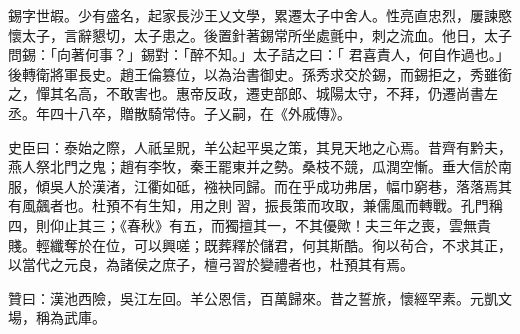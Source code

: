 \begin{pinyinscope}
 錫字世嘏。少有盛名，起家長沙王乂文學，累遷太子中舍人。性亮直忠烈，屢諫愍懷太子，言辭懇切，太子患之。後置針著錫常所坐處氈中，刺之流血。他日，太子問錫：「向著何事？」錫對：「醉不知。」太子詰之曰：「
 君喜責人，何自作過也。」後轉衛將軍長史。趙王倫篡位，以為治書御史。孫秀求交於錫，而錫拒之，秀雖銜之，憚其名高，不敢害也。惠帝反政，遷吏部郎、城陽太守，不拜，仍遷尚書左丞。年四十八卒，贈散騎常侍。子乂嗣，在《外戚傳》。



 史臣曰：泰始之際，人祇呈貺，羊公起平吳之策，其見天地之心焉。昔齊有黔夫，燕人祭北門之鬼；趙有李牧，秦王罷東并之勢。桑枝不競，瓜潤空慚。垂大信於南服，傾吳人於漢渚，江衢如砥，襁袂同歸。而在乎成功弗居，幅巾窮巷，落落焉其有風飆者也。杜預不有生知，用之則
 習，振長策而攻取，兼儒風而轉戰。孔門稱四，則仰止其三；《春秋》有五，而獨擅其一，不其優歟！夫三年之喪，雲無貴賤。輕纖奪於在位，可以興嗟；既葬釋於儲君，何其斯酷。徇以茍合，不求其正，以當代之元良，為諸侯之庶子，檀弓習於變禮者也，杜預其有焉。



 贊曰：漢池西險，吳江左回。羊公恩信，百萬歸來。昔之誓旅，懷經罕素。元凱文場，稱為武庫。



\end{pinyinscope}